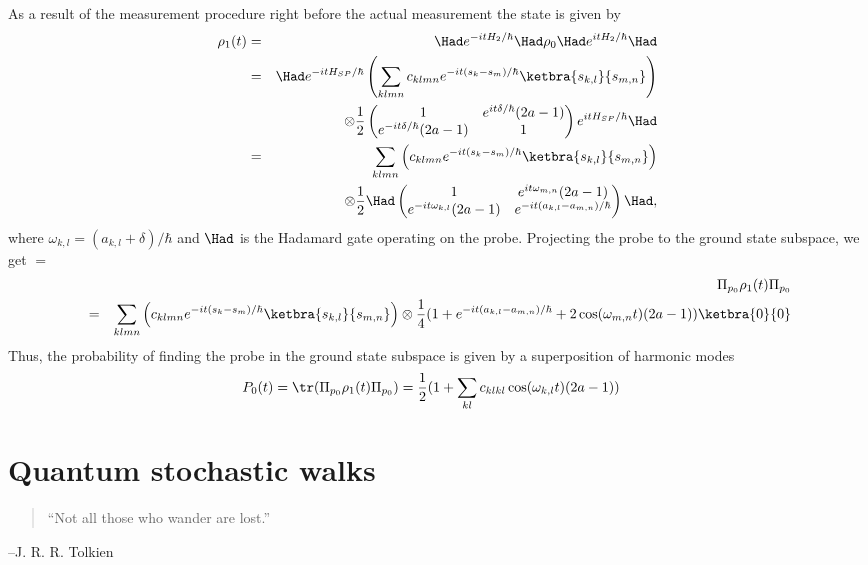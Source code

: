 \documentclass[11pt,oneside,final]{huthesis}%
\begin{document}
As a result of the measurement procedure right before the actual
measurement the state is given by
\begin{eqnarray}
\notag
\rho_1(t)
&=& \Had e^{-i t H_2/\hbar} \Had \rho_0 \Had e^{i t H_2/\hbar} \Had\\
\notag
&=&
\Had e^{-i t H_{SP}/\hbar} \left(\sum_{klmn} c_{klmn}
e^{-it(s_k-s_m)/\hbar}\ketbra{s_{k,l}}{s_{m,n}} \right)\\
&& \otimes
\frac{1}{2}
\begin{pmatrix}
1 & e^{it\delta/\hbar}(2a-1) \\
e^{-it\delta/\hbar}(2a-1) & 1
\end{pmatrix}
e^{i t H_{SP}/\hbar} \Had\nonumber\\
&=&
\sum_{klmn} \left(c_{klmn} e^{-it(s_k-s_m)/\hbar}\ketbra{s_{k,l}}{s_{m,n}} \right)\\
&&\otimes
\frac{1}{2} \Had
\begin{pmatrix}
1 & e^{it\omega_{m,n}}(2a-1) \\
e^{-it\omega_{k,l}} (2a-1) & e^{-it(a_{k,l}-a_{m,n})/\hbar}
\end{pmatrix}
\Had,\nonumber
\end{eqnarray}
where $\omega_{k,l} = (a_{k,l}+\delta)/\hbar$ and $\Had$ is the
Hadamard gate operating on the probe.
Projecting the probe to the ground state subspace, we get $=$
\begin{eqnarray*}&&
\Pi_{p_{0}}
\rho_1(t)
\Pi_{p_{0}}\\
&=& \sum_{klmn} \left(c_{klmn} e^{-it(s_k-s_m)/\hbar}\ketbra{s_{k,l}}{s_{m,n}} \right)
\otimes
\frac{1}{4} 
(1 +e^{-it(a_{k,l}-a_{m,n})/\hbar}
+ 2 \cos (\omega_{m,n} t) (2a-1))
\ketbra{0}{0}
\end{eqnarray*}
Thus, the probability of finding the probe in the ground state subspace is
given
by a superposition of harmonic modes
\begin{align}
P_{0}(t) &= \tr(\Pi_{p_{0}} \rho_1(t) \Pi_{p_{0}}) =
\frac{1}{2} (1 +\sum_{kl} c_{klkl} \cos(\omega_{k,l} t)(2a-1))
\end{align}



\chapter{Quantum stochastic walks}\label{chp:qsw}
\begin{quote}
``Not all those who wander are lost.''
\end{quote}
--J. R. R. Tolkien 
\end{document}

